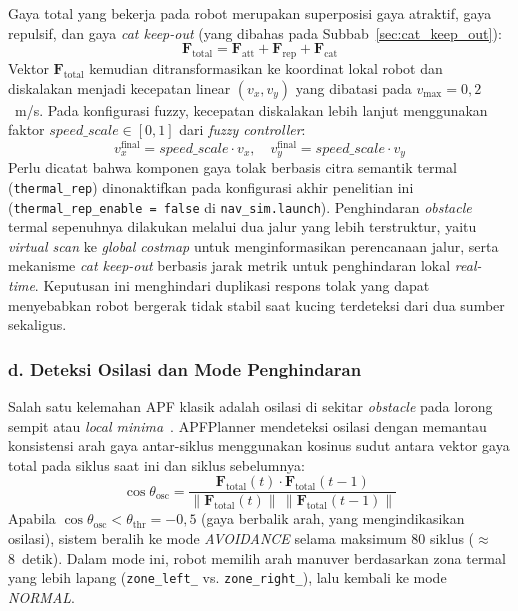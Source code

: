 Gaya total yang bekerja pada robot merupakan superposisi gaya atraktif, gaya repulsif, dan gaya \textit{cat keep-out} (yang dibahas pada Subbab~\ref{sec:cat_keep_out}):
\begin{equation}
    \mathbf{F}_\text{total} = \mathbf{F}_\text{att} + \mathbf{F}_\text{rep}
    + \mathbf{F}_\text{cat}
    \label{eq:f_total}
\end{equation}
Vektor $\mathbf{F}_\text{total}$ kemudian ditransformasikan ke koordinat lokal robot dan diskalakan menjadi kecepatan linear $(v_x, v_y)$ yang dibatasi pada $v_\text{max} = 0{,}2$~m/s. Pada konfigurasi fuzzy, kecepatan diskalakan lebih lanjut menggunakan faktor $\mathit{speed\_scale} \in [0, 1]$ dari \textit{fuzzy controller}:
\begin{equation}
    v_x^\text{final} = \mathit{speed\_scale} \cdot v_x, \quad
    v_y^\text{final} = \mathit{speed\_scale} \cdot v_y
    \label{eq:velocity_scale}
\end{equation}
Perlu dicatat bahwa komponen gaya tolak berbasis citra semantik termal (\texttt{thermal\_rep}) dinonaktifkan pada konfigurasi akhir penelitian ini (\texttt{thermal\_rep\_enable = false} di \texttt{nav\_sim.launch}). Penghindaran \textit{obstacle} termal sepenuhnya dilakukan melalui dua jalur yang lebih terstruktur, yaitu \textit{virtual scan} ke \textit{global costmap} untuk menginformasikan perencanaan jalur, serta mekanisme \textit{cat keep-out} berbasis jarak metrik untuk penghindaran lokal \textit{real-time}. Keputusan ini menghindari duplikasi respons tolak yang dapat menyebabkan robot bergerak tidak stabil saat kucing terdeteksi dari dua sumber sekaligus.

\subsubsection*{d. Deteksi Osilasi dan Mode Penghindaran}

Salah satu kelemahan APF klasik adalah osilasi di sekitar \textit{obstacle} pada lorong sempit atau \textit{local minima}~\cite{Lv2024}. APFPlanner mendeteksi osilasi dengan memantau konsistensi arah gaya antar-siklus menggunakan kosinus sudut antara vektor gaya total pada siklus saat ini dan siklus sebelumnya:
\begin{equation}
    \cos\theta_\text{osc} = \frac{\mathbf{F}_\text{total}(t) \cdot
    \mathbf{F}_\text{total}(t-1)}{\|\mathbf{F}_\text{total}(t)\|\,
    \|\mathbf{F}_\text{total}(t-1)\|}
    \label{eq:osc_detect}
\end{equation}
Apabila $\cos\theta_\text{osc} < \theta_\text{thr} = -0{,}5$ (gaya berbalik arah, yang mengindikasikan osilasi), sistem beralih ke mode \textit{AVOIDANCE} selama maksimum 80 siklus ($\approx$8~detik). Dalam mode ini, robot memilih arah manuver berdasarkan zona termal yang lebih lapang (\texttt{zone\_left\_} vs. \texttt{zone\_right\_}), lalu kembali ke mode \textit{NORMAL}.

